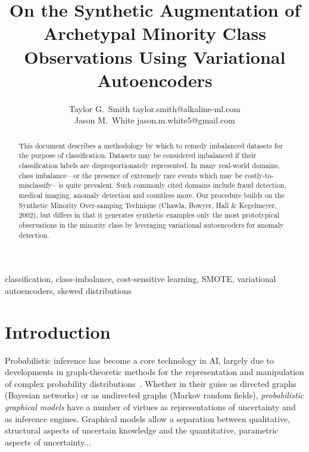 \documentclass[twoside,11pt]{article}
\begin{document}
\title{On the Synthetic Augmentation of Archetypal Minority Class Observations Using Variational Autoencoders}

\author{\name Taylor G.\ Smith \email taylor.smith@alkaline-ml.com \\
       \AND
       \name Jason M.\ White \email jason.m.white5@gmail.com}


\maketitle

\begin{abstract}%
This document describes a methodology by which to remedy imbalanced datasets for the purpose of classification. Datasets may be considered imbalanced if their classification labels are disproportionately represented. In many real-world domains, class imbalance---or the presence of extremely rare events which may be costly-to-misclassify---is quite prevalent. Such commonly cited domains include fraud detection, medical imaging, anomaly detection and countless more.  Our procedure builds on the Synthetic Minority Over-samping Technique (Chawla, Bowyer, Hall \& Kegelmeyer, 2002), but differs in that it generates synthetic examples  only the most prototypical observations in the minority class by leveraging variational autoencoders for anomaly detection.
\end{abstract}

\begin{keywords}
  classification, class-imbalance, cost-sensitive learning, SMOTE, variational autoencoders, skewed distributions
\end{keywords}

\section{Introduction}

Probabilistic inference has become a core technology in AI,
largely due to developments in graph-theoretic methods for the 
representation and manipulation of complex probability 
distributions~\citep{pearl:88}.  Whether in their guise as 
directed graphs (Bayesian networks) or as undirected graphs (Markov 
random fields), \emph{probabilistic graphical models} have a number 
of virtues as representations of uncertainty and as inference engines.  
Graphical models allow a separation between qualitative, structural
aspects of uncertain knowledge and the quantitative, parametric aspects 
of uncertainty...\\
\end{document}
